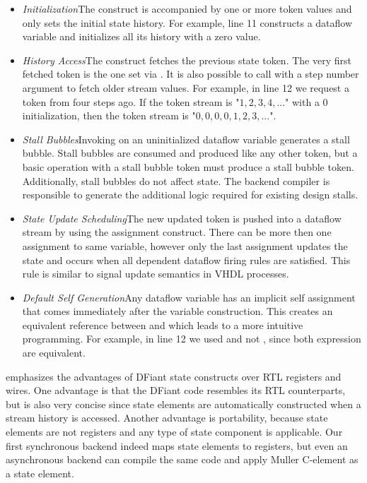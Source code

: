\begin{itemize}[leftmargin=*]
	\item \textit{Initialization}\quad The  construct is accompanied by one or more token values and only sets the initial state history. For example, line 11 constructs a dataflow variable and initializes all its history with a zero value. 
	\item \textit{History Access}\quad The  construct fetches the previous state token. The very first fetched token is the one set via . It is also possible to call  with a step number argument to fetch older stream values. For example, in line 12 we request a  token from four steps ago. If the  token stream is "$1,2,3,4,...$" with a $0$ initialization, then the  token stream is "$0,0,0,0,1,2,3,...$".
	\item \textit{Stall Bubbles}\quad Invoking  on an uninitialized dataflow variable generates a stall bubble. Stall bubbles are consumed and produced like any other token, but a basic operation with a stall bubble token must produce a stall bubble token. Additionally, stall bubbles do not affect state. The backend compiler is responsible to generate the additional logic required for existing design stalls. 
	\item \textit{State Update Scheduling}\quad The new updated token is pushed into a dataflow stream by using the \code{:=} assignment construct. There can be more then one assignment to same variable, however only the last assignment updates the state and occurs when all dependent dataflow firing rules are satisfied. This rule is similar to signal update semantics in VHDL processes.
	\item \textit{Default Self Generation}\quad Any dataflow  variable has an implicit self assignment  that comes immediately after the variable construction. This creates an equivalent reference between  and  which leads to a more intuitive programming.
	For example, in line 12 we used  and not , since both expression are equivalent.
\end{itemize} 
\vspace{0.5ex}

 emphasizes the advantages of DFiant state constructs over RTL registers and wires.
One advantage is that the DFiant code resembles its RTL counterparts, but is also very concise since state elements are automatically constructed when a stream history is accessed. Another advantage is portability, because state elements are not registers and any type of state component is applicable. Our first synchronous backend indeed maps state elements to registers, but even an asynchronous backend can compile the same code and apply Muller C-element\cite{muller1957theory} as a state element. 


